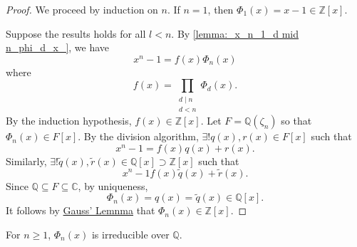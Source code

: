 \documentclass[notoc,notitlepage,nobib]{tufte-book}
\begin{document}
\begin{proof}
  We proceed by induction on $n$. If $n = 1$, then $\Phi_1(x) = x - 1 \in \mathbb{Z}[x]$.

  Suppose the results holds for all $l < n$. By \cref{lemma:_x_n_1_d mid n_phi_d_x_}, we
  have
  \begin{equation*}
    x^n - 1 = f(x) \Phi_n(x)
  \end{equation*}
  where
  \begin{equation*}
    f(x) = \prod_{\substack{d \mid n \\ d < n}} \Phi_d(x).
  \end{equation*}
  By the induction hypothesis, $f(x) \in \mathbb{Z}[x]$. Let $F =
  \mathbb{Q}(\zeta_n)$ so
  that $\Phi_n(x) \in F[x]$. By the division algorithm, $\exists ! q(x), r(x) \in F[x]$
  such that
  \begin{equation*}
    x^n - 1 = f(x) q(x) + r(x).
  \end{equation*}
  Similarly, $\exists ! \tilde{q}(x), \tilde{r}(x) \in \mathbb{Q}[x] \supset
  \mathbb{Z}[x]$ such that
  \begin{equation*}
    x^n - 1 f(x) \tilde{q}(x) + \tilde{r}(x).
  \end{equation*}
  Since $\mathbb{Q} \subseteq F \subseteq \mathbb{C}$, by uniqueness,
  \begin{equation*}
    \Phi_n(x) = q(x) = \tilde{q}(x) \in \mathbb{Q}[x].
  \end{equation*}
  It follows by \hyperref[thm:gauss_lemma]{Gauss' Lemnma} that $\Phi_n(x) \in
  \mathbb{Z}[x]$.
\end{proof}

\begin{thm}\label{thm:cyclotomic_polynomials_are_irreducible_over_q_}
  For $n \geq 1$, $\Phi_n(x)$ is irreducible over $\mathbb{Q}$.
\end{thm}
\end{document}
